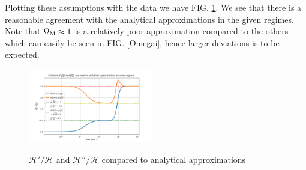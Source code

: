 \documentclass[%
reprint,
 amsmath,amssymb,
 aps,
]{revtex4-2}
\newcommand{\Hp}{\mathcal{H}}
\begin{document}
Plotting these assumptions with the data we have FIG. \ref{dHpddHp_vs_anal}. We see that there is a reasonable agreement with the analytical approximations in the given regimes. Note that $\Omega_{\text M}\approx1$ is a relatively poor approximation compared to the others which can easily be seen in FIG. \ref{Omegai}, hence larger deviations is to be expected.
\begin{figure}[h!]
	\caption{$\Hp'/\Hp$ and $\Hp''/\Hp$ compared to analytical approximations}
	\includegraphics[width = 0.48\textwidth]{Figures/dHpddHp_vs_anal.png}
	\label{dHpddHp_vs_anal}
\end{figure}
\end{document}
